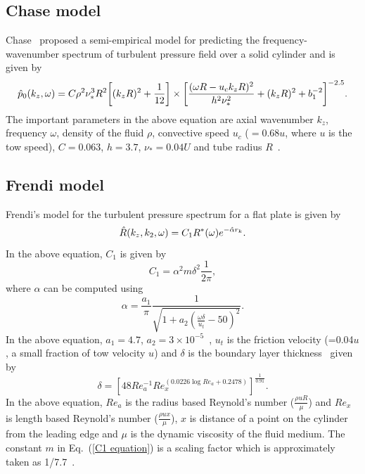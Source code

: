 \documentclass[11pt,cleanfoot]{asme2ej}
\begin{document}
\subsection{Chase model}\label{Chase model}
Chase~\cite{Chase1981} proposed a semi-empirical model for predicting the frequency-wavenumber spectrum of turbulent pressure field over a solid cylinder and is given by
\begin{equation}\label{Turbulent pressure spectrum equation Chase}
        \Hat{p}_{0}(k_{z},\omega) = C\rho^{2}\nu_{*}^{3}R^2\biggl[(k_{z}R)^{2}+\frac{1}{12}\biggr]\times \biggl[\frac{(\omega R-u_{c}k_{z}R)^{2}}{h^{2}\nu_{*}^{2}}+(k_{z}R)^{2}+b_1^{-2}\biggr]^{-2.5}.
\end{equation}
The important parameters in the above equation are axial wavenumber $k_{z}$, frequency $\omega$, density of the fluid $\rho$, convective speed $u_{c}$ ($=0.68u$, where $u$ is the tow speed), $C=0.063$, $h=3.7$, $\nu_{*}=0.04U$ and tube radius $R$~\cite{Chase1981, carpenter1983, knight1996, KUTTANCHANDRIKA2014, Huang2020}.
\subsection{Frendi model}
\label{Frendi model}
Frendi's model for the turbulent pressure spectrum for a flat plate is given by \cite{frendi2020}
\begin{equation}\label{Pressure spectrum equation from Frendi}
    \Hat{R}(k_{z},k_{2},\omega) = C_{1}R^{*}(\omega)e^{-\Hat{\alpha}r_{k}}.
\end{equation}
In the above equation, $C_{1}$ is given by
\begin{equation}\label{C1 equation}
C_{1} = \alpha^{2}m\delta^{2}\frac{1}{2\pi},   
\end{equation}
where $\alpha$ can be computed using
\begin{equation}\label{alpha equation}
   \alpha = \frac{a_1}{\pi}\frac{1}{\sqrt{1+a_2(\frac{\omega \delta}{u_{t}}-50)^{2}}}.
\end{equation}
In the above equation, $a_1=4.7$, $a_2=3\times10^{-5}$~\cite{frendi2020}, $u_{t}$ is the friction velocity (=0.04$u$, a small fraction of tow velocity $u$) and $\delta$ is the boundary layer thickness~\cite{Jordan2014} given by
\begin{equation}\label{boundary layer thickness}
    \delta = [48Re_a^{-1}Re_x^{(0.0226\log{Re_a}+0.2478)}]^{\frac{1}{0.91}}.
\end{equation}
In the above equation, $Re_a$ is the radius based Reynold's number ($\frac{\rho u R}{\mu}$) and $Re_x$ is length based Reynold's number ($\frac{\rho u x}{\mu}$), $x$ is distance of a point on the cylinder from the leading edge and $\mu$ is the dynamic viscosity of the fluid medium. The constant $m$ in Eq.~(\ref{C1 equation}) is a scaling factor which is approximately taken as 1/7.7~\cite{frendi2020}. 
\end{document}
